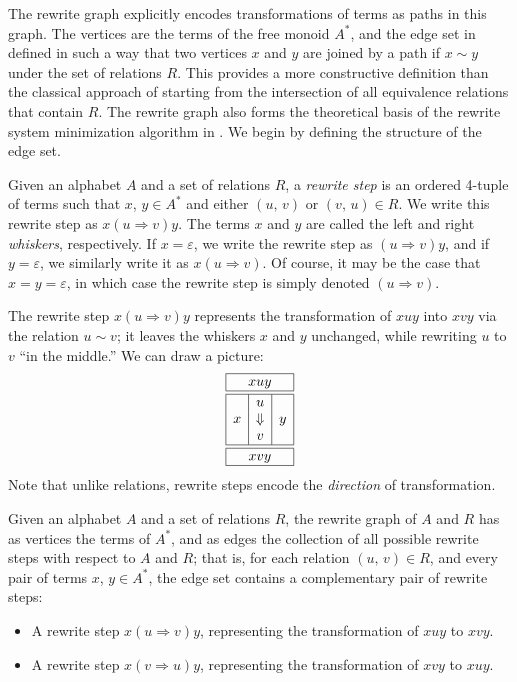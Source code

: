 \documentclass[../generics]{subfiles}
\begin{document}
The rewrite graph explicitly encodes transformations of terms as paths in this graph. The vertices are the terms of the free monoid $A^*$, and the edge set in defined in such a way that two vertices $x$ and $y$ are joined by a path if $x\sim y$ under the set of relations $R$. This provides a more constructive definition than the classical approach of starting from the intersection of all equivalence relations that contain $R$. The rewrite graph also forms the theoretical basis of the rewrite system minimization algorithm in . We begin by defining the structure of the edge set.

\begin{definition}
Given an alphabet $A$ and a set of relations $R$, a \emph{rewrite step} is an ordered 4-tuple of terms such that $x$, $y\in A^*$ and either $(u,\,v)$ or $(v,\,u)\in R$. We write this rewrite step as \index{$\Rightarrow$}$x(u\Rightarrow v)y$. The terms $x$ and $y$ are called the left and right \emph{whiskers}, respectively. If $x=\varepsilon$, we write the rewrite step as $(u\Rightarrow v)y$, and if $y=\varepsilon$, we similarly write it as $x(u\Rightarrow v)$. Of course, it may be the case that $x=y=\varepsilon$, in which case the rewrite step is simply denoted $(u\Rightarrow v)$.
\end{definition}
The rewrite step $x(u\Rightarrow v)y$ represents the transformation of $xuy$ into $xvy$ via the relation $u\sim v$; it leaves the whiskers $x$ and $y$ unchanged, while rewriting $u$ to $v$ ``in the middle.'' We can draw a picture:
\[
\begin{array}{|c|c|c|}
\hline
\multicolumn{3}{|c|}{xuy}\\
\hline
\hline
&u&\\
x&\Downarrow&y\\
&v&\\
\hline
\hline
\multicolumn{3}{|c|}{xvy}\\
\hline
\end{array}
\]
Note that unlike relations, rewrite steps encode the \emph{direction} of transformation.
\begin{definition}
Given an alphabet $A$ and a set of relations $R$, the rewrite graph of $A$ and $R$ has as vertices the terms of $A^*$, and as edges the collection of all possible rewrite steps with respect to $A$ and $R$; that is, for each relation $(u,\,v)\in R$, and every pair of terms $x$, $y\in A^*$, the edge set contains a complementary pair of rewrite steps:
\begin{itemize}
\item A rewrite step $x(u\Rightarrow v)y$, representing the transformation of $xuy$ to $xvy$.
\item A rewrite step $x(v\Rightarrow u)y$, representing the transformation of $xvy$ to $xuy$.
\end{itemize}
\end{definition}
\end{document}
